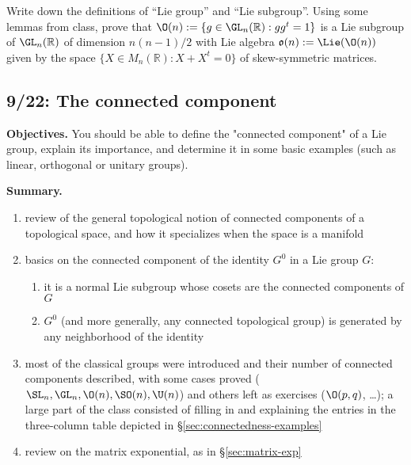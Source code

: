 \documentclass[reqno]{amsart} 
\begin{document}
\begin{homework}
  Write down the definitions of ``Lie group'' and ``Lie subgroup''.  Using some lemmas from class, prove that $\O(n) := \{g \in \GL_n(\mathbb{R}) : g g^t = 1\}$ is a Lie subgroup of $\GL_n(\mathbb{R})$ of dimension $n(n-1)/2$ with Lie algebra $\mathfrak{o}(n) := \Lie(\O(n))$ given by the space $\{ X \in M_n(\mathbb{R}) : X + X^t = 0 \}$ of skew-symmetric matrices.
\end{homework}

\newpage
\subsection{9/22: The connected component}
\label{sec:org254d9af}
\textbf{Objectives.} You should be able to define the "connected component" of a Lie group, explain its importance, and determine it in some basic examples (such as linear, orthogonal or unitary groups).

\textbf{Summary.}
\begin{enumerate}
\item review of the general topological notion of connected components of a topological space, and how it specializes when the space is a manifold
\item basics on the connected component of the identity \(G^0\) in a Lie group \(G\):
  \begin{enumerate}
  \item it is a normal Lie subgroup whose cosets are the connected components of \(G\)
  \item \(G^0\) (and more generally, any connected topological group) is generated by any neighborhood of the identity
  \end{enumerate}
\item most of the classical groups were introduced and their number of connected components described, with some cases proved (\(\SL_n, \GL_n, \O(n), \SO(n), \U(n)\)) and others left as exercises (\(\O(p,q)\), \ldots{}); a large part of the class consisted of filling in and explaining the entries in the three-column table depicted in \S\ref{sec:connectedness-examples}
\item review on the matrix exponential, as in \S\ref{sec:matrix-exp}
\end{enumerate}
\end{document}
